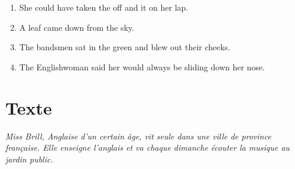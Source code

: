 \documentclass{fiche}
\begin{document}

\begin{anglais}
\begin{enumerate}[label=\arabic*.,itemsep=2mm,leftmargin=*]
  \item She could have taken the  off and  it on her lap.
  \item A leaf came  down from the sky.
  \item The bandsmen sat in the green  and blew out their cheeks.
  \item The Englishwoman said her  would always be sliding down her nose.
\end{enumerate}
\end{anglais}

\newpage
\section{Texte}

\noindent\small\textit{Miss Brill, Anglaise d'un certain âge, vit seule dans une ville de
province française. Elle enseigne l'anglais et va chaque dimanche écouter la musique au
jardin public.}\normalsize
\end{document}
